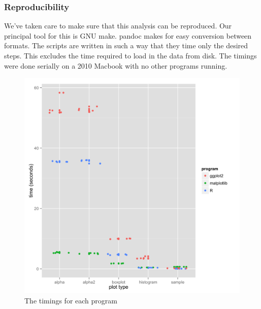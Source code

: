 \documentclass[]{article}
\begin{document}
\subsubsection{Reproducibility}\label{reproducibility}

We've taken care to make sure that this analysis can be reproduced. Our
principal tool for this is GNU make. pandoc makes for easy conversion
between formats. The scripts are written in such a way that they time
only the desired steps. This excludes the time required to load in the
data from disk. The timings were done serially on a 2010 Macbook with no
other programs running.

\begin{figure}[htbp]
\centering
\includegraphics{timingplots.png}
\caption{The timings for each program}
\end{figure}
\end{document}

